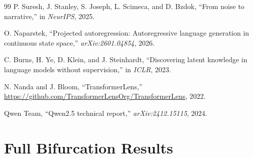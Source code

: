 \documentclass[11pt,a4paper]{article}
\begin{document}
\begin{thebibliography}{99}
P. Suresh, J. Stanley, S. Joseph, L. Scimeca, and D. Bzdok, ``From noise to narrative,'' in \emph{NeurIPS}, 2025.

O. Naparstek, ``Projected autoregression: Autoregressive language generation in continuous state space,'' \emph{arXiv:2601.04854}, 2026.

C. Burns, H. Ye, D. Klein, and J. Steinhardt, ``Discovering latent knowledge in language models without supervision,'' in \emph{ICLR}, 2023.

N. Nanda and J. Bloom, ``TransformerLens,'' \url{https://github.com/TransformerLensOrg/TransformerLens}, 2022.

Qwen Team, ``Qwen2.5 technical report,'' \emph{arXiv:2412.15115}, 2024.

\end{thebibliography}
\endgroup

\clearpage
\appendix

\section{Full Bifurcation Results}
\label{app:bifurcation}
\end{document}
